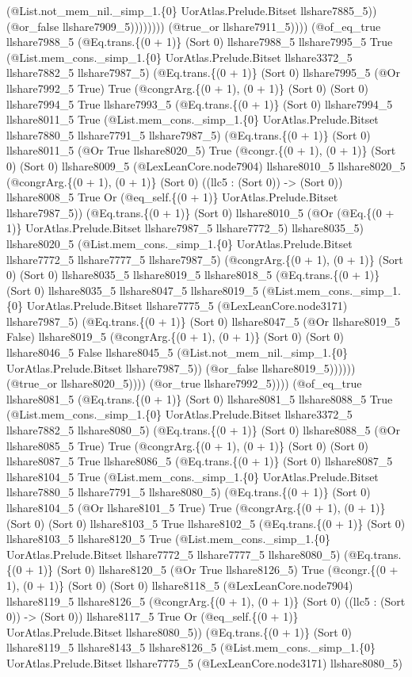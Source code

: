 \documentclass[11pt]{article}
\begin{document}
(@List.not\_mem\_nil.\_simp\_1.\{0\} UorAtlas.Prelude.Bitset llshare7885\_5)) (@or\_false llshare7909\_5)))))))) (@true\_or llshare7911\_5)))) (@of\_eq\_true llshare7988\_5 (@Eq.trans.\{(0 + 1)\} (Sort 0) llshare7988\_5 llshare7995\_5 True (@List.mem\_cons.\_simp\_1.\{0\} UorAtlas.Prelude.Bitset llshare3372\_5 llshare7882\_5 llshare7987\_5) (@Eq.trans.\{(0 + 1)\} (Sort 0) llshare7995\_5 (@Or llshare7992\_5 True) True (@congrArg.\{(0 + 1), (0 + 1)\} (Sort 0) (Sort 0) llshare7994\_5 True llshare7993\_5 (@Eq.trans.\{(0 + 1)\} (Sort 0) llshare7994\_5 llshare8011\_5 True (@List.mem\_cons.\_simp\_1.\{0\} UorAtlas.Prelude.Bitset llshare7880\_5 llshare7791\_5 llshare7987\_5) (@Eq.trans.\{(0 + 1)\} (Sort 0) llshare8011\_5 (@Or True llshare8020\_5) True (@congr.\{(0 + 1), (0 + 1)\} (Sort 0) (Sort 0) llshare8009\_5 (@LexLeanCore.node7904) llshare8010\_5 llshare8020\_5 (@congrArg.\{(0 + 1), (0 + 1)\} (Sort 0) ((llc5 : (Sort 0)) -> (Sort 0)) llshare8008\_5 True Or (@eq\_self.\{(0 + 1)\} UorAtlas.Prelude.Bitset llshare7987\_5)) (@Eq.trans.\{(0 + 1)\} (Sort 0) llshare8010\_5 (@Or (@Eq.\{(0 + 1)\} UorAtlas.Prelude.Bitset llshare7987\_5 llshare7772\_5) llshare8035\_5) llshare8020\_5 (@List.mem\_cons.\_simp\_1.\{0\} UorAtlas.Prelude.Bitset llshare7772\_5 llshare7777\_5 llshare7987\_5) (@congrArg.\{(0 + 1), (0 + 1)\} (Sort 0) (Sort 0) llshare8035\_5 llshare8019\_5 llshare8018\_5 (@Eq.trans.\{(0 + 1)\} (Sort 0) llshare8035\_5 llshare8047\_5 llshare8019\_5 (@List.mem\_cons.\_simp\_1.\{0\} UorAtlas.Prelude.Bitset llshare7775\_5 (@LexLeanCore.node3171) llshare7987\_5) (@Eq.trans.\{(0 + 1)\} (Sort 0) llshare8047\_5 (@Or llshare8019\_5 False) llshare8019\_5 (@congrArg.\{(0 + 1), (0 + 1)\} (Sort 0) (Sort 0) llshare8046\_5 False llshare8045\_5 (@List.not\_mem\_nil.\_simp\_1.\{0\} UorAtlas.Prelude.Bitset llshare7987\_5)) (@or\_false llshare8019\_5)))))) (@true\_or llshare8020\_5)))) (@or\_true llshare7992\_5)))) (@of\_eq\_true llshare8081\_5 (@Eq.trans.\{(0 + 1)\} (Sort 0) llshare8081\_5 llshare8088\_5 True (@List.mem\_cons.\_simp\_1.\{0\} UorAtlas.Prelude.Bitset llshare3372\_5 llshare7882\_5 llshare8080\_5) (@Eq.trans.\{(0 + 1)\} (Sort 0) llshare8088\_5 (@Or llshare8085\_5 True) True (@congrArg.\{(0 + 1), (0 + 1)\} (Sort 0) (Sort 0) llshare8087\_5 True llshare8086\_5 (@Eq.trans.\{(0 + 1)\} (Sort 0) llshare8087\_5 llshare8104\_5 True (@List.mem\_cons.\_simp\_1.\{0\} UorAtlas.Prelude.Bitset llshare7880\_5 llshare7791\_5 llshare8080\_5) (@Eq.trans.\{(0 + 1)\} (Sort 0) llshare8104\_5 (@Or llshare8101\_5 True) True (@congrArg.\{(0 + 1), (0 + 1)\} (Sort 0) (Sort 0) llshare8103\_5 True llshare8102\_5 (@Eq.trans.\{(0 + 1)\} (Sort 0) llshare8103\_5 llshare8120\_5 True (@List.mem\_cons.\_simp\_1.\{0\} UorAtlas.Prelude.Bitset llshare7772\_5 llshare7777\_5 llshare8080\_5) (@Eq.trans.\{(0 + 1)\} (Sort 0) llshare8120\_5 (@Or True llshare8126\_5) True (@congr.\{(0 + 1), (0 + 1)\} (Sort 0) (Sort 0) llshare8118\_5 (@LexLeanCore.node7904) llshare8119\_5 llshare8126\_5 (@congrArg.\{(0 + 1), (0 + 1)\} (Sort 0) ((llc5 : (Sort 0)) -> (Sort 0)) llshare8117\_5 True Or (@eq\_self.\{(0 + 1)\} UorAtlas.Prelude.Bitset llshare8080\_5)) (@Eq.trans.\{(0 + 1)\} (Sort 0) llshare8119\_5 llshare8143\_5 llshare8126\_5 (@List.mem\_cons.\_simp\_1.\{0\} UorAtlas.Prelude.Bitset llshare7775\_5 (@LexLeanCore.node3171) llshare8080\_5) 
\end{document}
